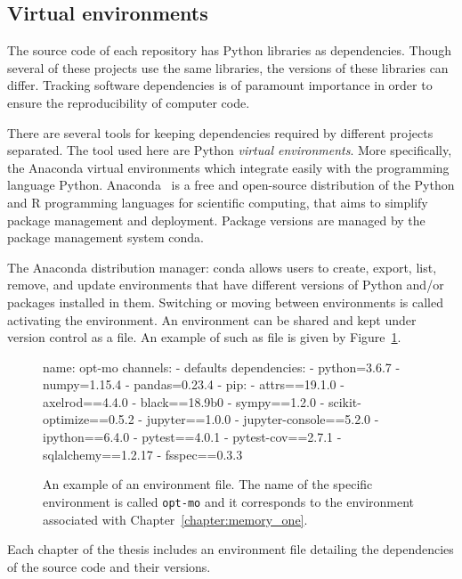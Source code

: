 \subsection{Virtual environments}

The source code of each repository has Python libraries as dependencies. Though
several of these projects use the same libraries, the versions of these
libraries can differ. Tracking software dependencies is of paramount importance
in order to ensure the reproducibility of computer code.

There are several tools for keeping dependencies required by different projects
separated. The tool used here are Python \textit{virtual environments}. More
specifically, the Anaconda virtual environments which integrate easily with the
programming language Python. Anaconda~\cite{anaconda} is a free and open-source distribution of
the Python and R programming languages for scientific computing, that aims to
simplify package management and deployment. Package versions are managed by the
package management system conda.

The Anaconda
 distribution manager: conda allows users to create, export, list, remove, and update environments that
have different versions of Python and/or packages installed in them. Switching
or moving between environments is called activating the environment. An environment
can be shared and kept under version control as a file. An example of
such as file is given by Figure~\ref{fig:environment_file}.

\begin{figure}
\begin{shell}
name: opt-mo
channels:
  - defaults
dependencies:
  - python=3.6.7
  - numpy=1.15.4
  - pandas=0.23.4
  - pip:
    - attrs==19.1.0
    - axelrod==4.4.0
    - black==18.9b0
    - sympy==1.2.0
    - scikit-optimize==0.5.2
    - jupyter==1.0.0
    - jupyter-console==5.2.0
    - ipython==6.4.0
    - pytest==4.0.1
    - pytest-cov==2.7.1
    - sqlalchemy==1.2.17
    - fsspec==0.3.3
\end{shell}
\caption{An example of an environment file. The name of the specific environment is called
\texttt{opt-mo} and it corresponds to the environment associated with
Chapter~\ref{chapter:memory_one}.}\label{fig:environment_file}
\end{figure}

Each chapter of the thesis includes an environment file detailing the dependencies
of the source code and their versions.

